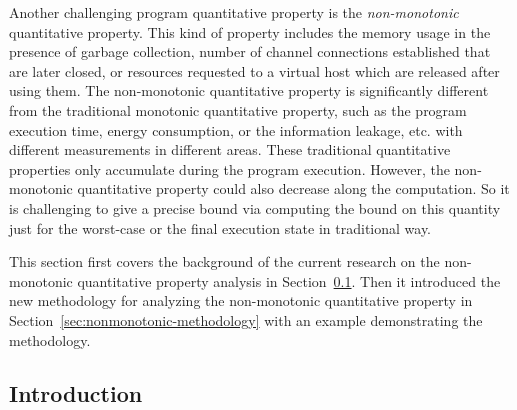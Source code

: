 Another challenging program quantitative property is the \emph{non-monotonic} quantitative property.
This kind of property includes the memory usage in the presence of garbage collection,
number of channel connections established that are later closed,
or resources requested to a virtual host which are released after using them. 
The non-monotonic quantitative property is significantly different from the traditional monotonic quantitative property,
such as the program execution time, energy consumption,
or the information leakage, etc. with different measurements in different areas.
These traditional quantitative properties only accumulate during the program execution. 
However, the non-monotonic quantitative property could also decrease along the computation.
So it is challenging to give a precise bound via computing the bound on this quantity just for the worst-case or the final execution state in traditional way.

This section first covers the background of the current research on the non-monotonic
quantitative property analysis in Section~\ref{sec:nonmonotonic-intro}.
Then it introduced the new methodology for analyzing the non-monotonic quantitative property in Section~\ref{sec:nonmonotonic-methodology} with an example demonstrating the methodology.
\subsection{Introduction }
\label{sec:nonmonotonic-intro}
